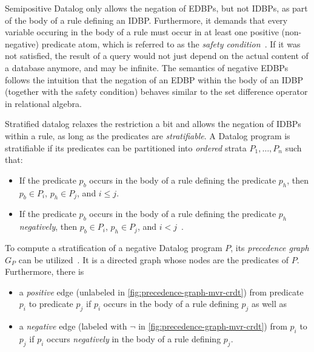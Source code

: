 
Semipositive Datalog only allows the negation of \acp{EDBP}, but not \acp{IDBP},
as part of the body of a rule defining an \ac{IDBP}.
Furthermore, it demands that every variable occuring in the body of a rule must
occur in at least one positive (non-negative) predicate atom,
which is referred to as the \emph{safety condition}~\cite{green2013datalog}.
If it was not satisfied, the result of a query would not just depend on the
actual content of a database anymore, and may be infinite.
The semantics of negative \acp{EDBP} follows the intuition that
the negation of an \ac{EDBP} within the body of an \ac{IDBP} (together with
the safety condition) behaves similar to the set difference operator
in relational algebra.

Stratified datalog relaxes the restriction a bit and allows the
negation of \acp{IDBP} within a rule, as long as the predicates
are \emph{stratifiable}.
A Datalog program is stratifiable if its predicates can be partitioned into
\emph{ordered} strata \(P_1, \ldots, P_n\) such that:

\begin{itemize}
	\item If the predicate \(p_b\) occurs in the body of a rule defining
	      the predicate \(p_h\), then \(p_b \in P_i\), \(p_h \in P_j\), and
	      \(i \leq j\).
	\item If the predicate \(p_b\) occurs in the body of a rule defining
	      the predicate \(p_h\) \emph{negatively}, then \(p_b \in P_i\),
	      \(p_h \in P_j\), and \(i < j\)~\cite{green2013datalog}.
\end{itemize}

To compute a stratification of a negative Datalog program \(P\),
its \emph{precedence graph} \(G_P\) can be utilized~\cite{green2013datalog}.
It is a directed graph whose nodes are the predicates of \(P\).
Furthermore, there is

\begin{itemize}
	\item a \emph{positive} edge
	      (unlabeled in \ref{fig:precedence-graph-mvr-crdt})
	      from predicate \(p_i\) to predicate \(p_j\)
	      if \(p_i\) occurs in the body of a rule defining \(p_j\) as well as
	\item a \emph{negative} edge
	      (labeled with \(\lnot\) in \ref{fig:precedence-graph-mvr-crdt})
	      from \(p_i\) to \(p_j\)
	      if \(p_i\) occurs \emph{negatively} in the body of a rule defining \(p_j\).
\end{itemize}

